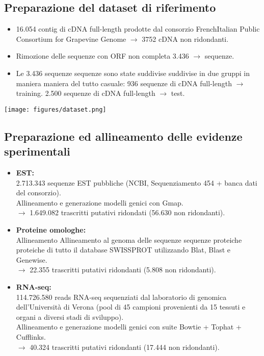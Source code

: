 \documentclass{article}
\begin{document}
\subsection{Preparazione del dataset di riferimento}
\begin{itemize}
    \item 16.054 contig di cDNA full-length prodotte dal consorzio FrenchItalian Public Consortium for Grapevine Genome $\rightarrow$ 3752 cDNA non ridondanti.
    \item Rimozione delle sequenze con ORF non completa  3.436 $\rightarrow$ sequenze.
    \item Le 3.436 sequenze sequenze sono state suddivise suddivise in due gruppi in maniera maniera
    del tutto casuale:
        \subitem{-} 936 sequenze di cDNA full-length $\rightarrow$ training.
        \subitem{-} 2.500 sequenze di cDNA full-length $\rightarrow$ test.
\end{itemize}
\begin{center}
    \texttt{[image: figures/dataset.png]}
\end{center}

\subsection{Preparazione ed allineamento delle evidenze sperimentali}
\begin{itemize}
    \item \textbf{EST:}\\ 2.713.343 sequenze EST pubbliche (NCBI,
    Sequenziamento 454 + banca dati del consorzio). \\Allineamento e generazione modelli genici con Gmap.\\$\rightarrow$ 1.649.082 trascritti putativi ridondati (56.630 non
    ridondanti).
    \item \textbf{Proteine omologhe:}\\Allineamento Allineamento al genoma delle sequenze sequenze proteiche proteiche di
    tutto il database SWISSPROT utilizzando Blat, Blast e Genewise.\\
    $\rightarrow$ 22.355 trascritti putativi ridondanti (5.808 non
    ridondanti).
    \item \textbf{RNA-seq:}\\114.726.580 reads RNA-seq sequenziati dal laboratorio
    di genomica dell’Università di Verona (pool di 45
    campioni provenienti da 15 tessuti e organi a diversi
    stadi di sviluppo).\\Allineamento e generazione modelli genici con suite
    Bowtie + Tophat + Cufflinks.\\
    $\rightarrow$ 40.324 trascritti putativi ridondanti (17.444 non
    ridondanti).
\end{itemize}
\end{document}

